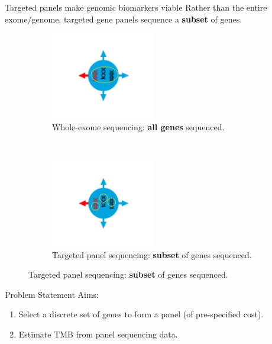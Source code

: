 \documentclass{beamer}
\begin{document}
\begin{frame}{Targeted panels make genomic biomarkers viable}
Rather than the entire exome/genome, targeted gene panels sequence a \textbf{subset} of genes.

\begin{figure}[t!]
    \centering
    \begin{subfigure}[t]{0.45\textwidth}
        \centering
        \includegraphics[height=1.5in]{../results/figures/IC5.png}
        \caption{Whole-exome sequencing: \textbf{all genes} sequenced.}
    \end{subfigure}
    ~ 
    \begin{subfigure}[t]{0.45\textwidth}
        \centering
        \includegraphics[height=1.5in]{../results/figures/IC6.png}
        \caption{Targeted panel sequencing: \textbf{subset} of genes sequenced.}
    \end{subfigure}
\end{figure}

\end{frame}
\begin{frame}{Problem Statement}
Aims: 

\begin{enumerate}[1]
\item Select a discrete set of genes to form a panel (of pre-specified cost). 
\item Estimate TMB from panel sequencing data.
\end{enumerate} 
~\\
\end{frame}
\end{document}
